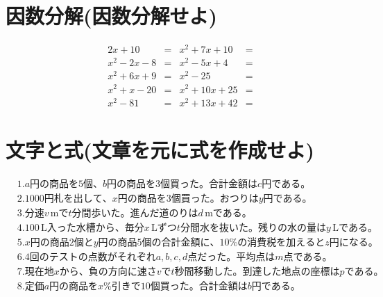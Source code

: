 \documentclass[paper=b4j,landscape,twocolumn,fleqn]{jlreq}
\begin{document}
\section{因数分解(因数分解せよ)}
\begin{align*}
    2x+10 &= & x^2+7x+10 &= \\
    x^2-2x-8 &= & x^2-5x+4 &= \\
    x^2+6x+9 &= & x^2-25 &= \\
    x^2+x-20 &= & x^2+10x+25 &= \\
    x^2-81 &= & x^2+13x+42 &= 
\end{align*}
\section{文字と式(文章を元に式を作成せよ)}
\begin{align*}
　&1.　a円の商品を5個、b円の商品を3個買った。合計金額はc円である。\\
　&2.　1000円札を出して、x円の商品を3個買った。おつりはy円である。\\
　&3.　分速v\,\text{m}でt分間歩いた。進んだ道のりはd\,\text{m}である。\\
　&4.　100\,\text{L}入った水槽から、毎分x\,\text{L}ずつt分間水を抜いた。残りの水の量はy\,\text{L}である。\\
　&5.　x円の商品2個とy円の商品5個の合計金額に、10\%の消費税を加えるとz円になる。\\
　&6.　4回のテストの点数がそれぞれa, b, c, d点だった。平均点はm点である。\\
　&7.　現在地xから、負の方向に速さvでt秒間移動した。到達した地点の座標はpである。\\
　&8.　定価a円の商品をx\%引きで10個買った。合計金額はb円である。
\end{align*}
\end{document}
